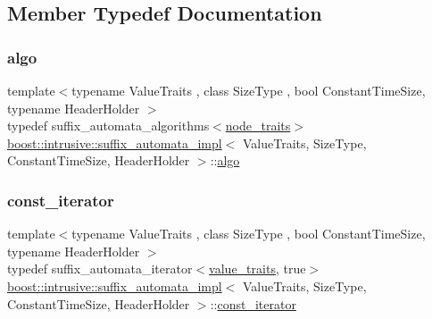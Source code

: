 \subsection{Member Typedef Documentation}
\mbox{\label{classboost_1_1intrusive_1_1suffix__automata__impl_afa6f98d48851586ded5a3141789336d7}} 
\subsubsection{\texorpdfstring{algo}{algo}}
{\footnotesize\ttfamily template$<$typename Value\+Traits , class Size\+Type , bool Constant\+Time\+Size, typename Header\+Holder $>$ \\
typedef suffix\+\_\+automata\+\_\+algorithms$<$\hyperlink{classboost_1_1intrusive_1_1suffix__automata__impl_a3bf4d50a1aa7e13e6d6ded62d04a0296}{node\+\_\+traits}$>$ \hyperlink{classboost_1_1intrusive_1_1suffix__automata__impl}{boost\+::intrusive\+::suffix\+\_\+automata\+\_\+impl}$<$ Value\+Traits, Size\+Type, Constant\+Time\+Size, Header\+Holder $>$\+::\hyperlink{classboost_1_1intrusive_1_1suffix__automata__impl_afa6f98d48851586ded5a3141789336d7}{algo}}

\mbox{\label{classboost_1_1intrusive_1_1suffix__automata__impl_a370d76fc868eac7454dc2554a8fc9494}} 
\subsubsection{\texorpdfstring{const\+\_\+iterator}{const\_iterator}}
{\footnotesize\ttfamily template$<$typename Value\+Traits , class Size\+Type , bool Constant\+Time\+Size, typename Header\+Holder $>$ \\
typedef suffix\+\_\+automata\+\_\+iterator$<$\hyperlink{classboost_1_1intrusive_1_1suffix__automata__impl_abbf3dee8caf18613db903931801c6076}{value\+\_\+traits}, true$>$ \hyperlink{classboost_1_1intrusive_1_1suffix__automata__impl}{boost\+::intrusive\+::suffix\+\_\+automata\+\_\+impl}$<$ Value\+Traits, Size\+Type, Constant\+Time\+Size, Header\+Holder $>$\+::\hyperlink{classboost_1_1intrusive_1_1suffix__automata__impl_a370d76fc868eac7454dc2554a8fc9494}{const\+\_\+iterator}}


